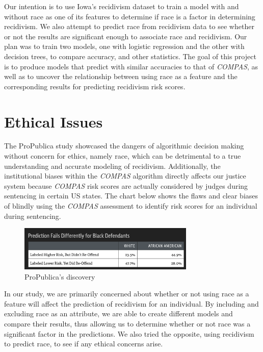 \documentclass[11pt, sigconf]{acmart}
\begin{document}
Our intention is to use Iowa’s recidivism dataset to train a model with and without race as one of its features to determine if race is a factor in determining recidivism. We also attempt to predict race from recidivism data to see whether or not the results are significant enough to associate race and recidivism. Our plan was to train two models, one with logistic regression and the other with decision trees, to compare accuracy, and other statistics. The goal of this project is to produce models that predict with similar accuracies to that of \emph{COMPAS}, as well as to uncover the relationship between using race as a feature and the corresponding results for predicting recidivism risk scores.

\section{Ethical Issues}

\hspace{5mm}The ProPublica study showcased the dangers of algorithmic decision making without concern for ethics, namely race, which can be detrimental to a true understanding and accurate modeling of recidivism. Additionally, the institutional biases within the \emph{COMPAS} algorithm directly affects our justice system because \emph{COMPAS} risk scores are actually considered by judges during sentencing in certain US states. The chart below shows the flaws and clear biases of blindly using the \emph{COMPAS} assessment to identify risk scores for an individual during sentencing.  
\begin{figure}[h] 	
\centering
\includegraphics[width=3.3in]{asdf.png}
\caption{ProPublica's discovery}
\end{figure}


In our study, we are primarily concerned about whether or not using race as a feature will affect the prediction of recidivism for an individual. By including and excluding race as an attribute, we are able to create different models and compare their results, thus allowing us to determine whether or not race was a significant factor in the predictions. We also tried the opposite, using recidivism to predict race, to see if any ethical concerns arise. 
\end{document}
